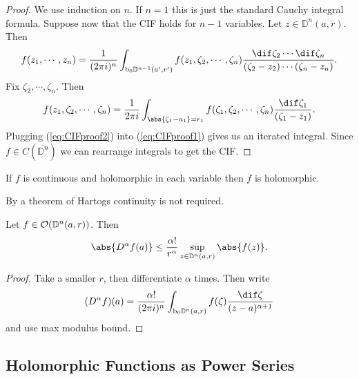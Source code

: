 \begin{proof}
    We use induction on $n$. If $n=1$ this is just the standard Cauchy integral formula. Suppose now that the CIF holds for $n-1$ variables. Let $z \in \mathbb{D}^n(a,r)$. Then
    \begin{align}\label{eq:CIFproof1}
        f(z_1, \cdots, z_n) = \frac{1}{(2 \pi i)^n} \int_{\bdy_0 \mathbb{D}^{n-1} (a',r')} f(z_1 , \zeta_2 , \cdots, \zeta_n) \frac{\dif \zeta_2 \cdots \dif \zeta_n}{(\zeta_2 - z_2 ) \cdots (\zeta_n - z_n)}.
    \end{align}
    Fix $\zeta_2, \cdots, \zeta_n$. Then
    \begin{align}\label{eq:CIFproof2}
        f(z_1 , \zeta_2, \cdots, \zeta_n) = \frac{1}{2 \pi i} \int_{\abs{\zeta_1 - a_1} = r_1} f(\zeta_1 , \zeta_2, \cdots, \zeta_n) \frac{\dif \zeta_1}{(\zeta_1 - z_1)}.
    \end{align}
    Plugging (\ref{eq:CIFproof2}) into (\ref{eq:CIFproof1}) gives us an iterated integral. Since $f \in C(\overline{\mathbb{D}^n})$ we can rearrange integrals to get the CIF.
\end{proof}

\begin{corollary}
    If $f $ is continuous and holomorphic in each variable then $f$ is holomorphic.
\end{corollary}

\begin{remark}
    By a theorem of Hartogs continuity is not required.
\end{remark}

\begin{corollary}
    Let $f \in \mathcal{O}(\mathbb{D}^n(a,r))$. Then
    \begin{align*}
        \abs{D^\alpha f(a)} \leq \frac{\alpha!}{r^\alpha} \sup_{z \in \DD^n (a,r) }\abs{f(z)}.
    \end{align*}
\end{corollary}

\begin{proof}
    Take a smaller $r$, then differentiate $\alpha$ times. Then write
    \begin{align*}
        (D^\alpha f)(a) = \frac{\alpha!}{(2 \pi i)^n} \int_{\bdy_0 \mathbb{D}^n(a,r)} f(\zeta) \frac{\dif \zeta}{(z-a)^{\alpha+1}}
    \end{align*}
    and use max modulus bound.
\end{proof}

\subsection{Holomorphic Functions as Power Series}


